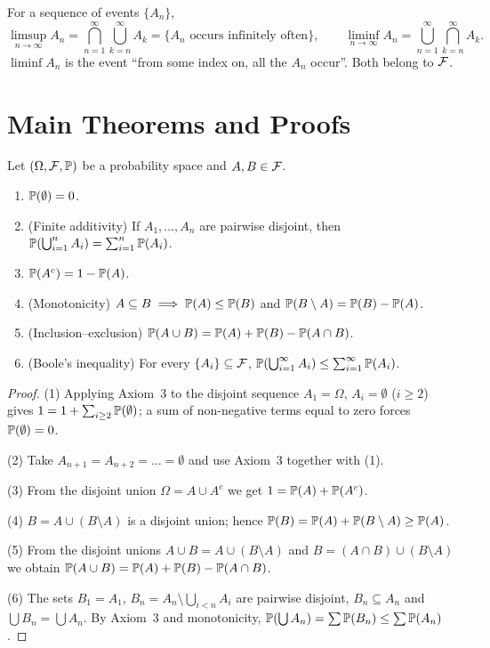 \documentclass[main.tex]{subfiles}
\begin{document}
\begin{definition}
For a sequence of events $\{A_n\}$,
\[
\limsup_{n\to\infty} A_n = \bigcap_{n=1}^\infty\bigcup_{k=n}^\infty A_k = \{A_n \text{ occurs infinitely often}\},\qquad
\liminf_{n\to\infty} A_n = \bigcup_{n=1}^\infty\bigcap_{k=n}^\infty A_k .
\]
$\liminf A_n$ is the event ``from some index on, all the $A_n$ occur''. Both belong to $\F$.
\end{definition}

\section{Main Theorems and Proofs}

\begin{proposition}\label{prop:temel-ozellikler}
Let $(\Omega,\F,\P)$ be a probability space and $A,B\in\F$.
\begin{enumerate}
  \item $\P(\emptyset)=0$.
  \item (Finite additivity) If $A_1,\dots,A_n$ are pairwise disjoint, then $\P(\bigcup_{i=1}^n A_i)=\sum_{i=1}^n\P(A_i)$.
  \item $\P(A^c)=1-\P(A)$.
  \item (Monotonicity) $A\subseteq B \implies \P(A)\le \P(B)$ and $\P(B\setminus A)=\P(B)-\P(A)$.
  \item (Inclusion--exclusion) $\P(A\cup B)=\P(A)+\P(B)-\P(A\cap B)$.
  \item (Boole's inequality) For every $\{A_i\}\subseteq\F$, $\P(\bigcup_{i=1}^\infty A_i)\le\sum_{i=1}^\infty \P(A_i)$.
\end{enumerate}
\end{proposition}
\begin{proof}
(1) Applying Axiom~3 to the disjoint sequence $A_1=\Omega$, $A_i=\emptyset$ ($i\ge2$) gives $1 = 1 + \sum_{i\ge 2}\P(\emptyset)$; a sum of non-negative terms equal to zero forces $\P(\emptyset)=0$.

(2) Take $A_{n+1}=A_{n+2}=\dots=\emptyset$ and use Axiom~3 together with (1).

(3) From the disjoint union $\Omega = A\cup A^c$ we get $1=\P(A)+\P(A^c)$.

(4) $B = A\cup(B\setminus A)$ is a disjoint union; hence $\P(B)=\P(A)+\P(B\setminus A)\ge \P(A)$.

(5) From the disjoint unions $A\cup B = A\cup (B\setminus A)$ and $B = (A\cap B)\cup(B\setminus A)$ we obtain $\P(A\cup B)=\P(A)+\P(B)-\P(A\cap B)$.

(6) The sets $B_1=A_1$, $B_n = A_n\setminus\bigcup_{i<n}A_i$ are pairwise disjoint, $B_n\subseteq A_n$ and $\bigcup B_n=\bigcup A_n$. By Axiom~3 and monotonicity, $\P(\bigcup A_n)=\sum \P(B_n)\le\sum\P(A_n)$.
\end{proof}
\end{document}
